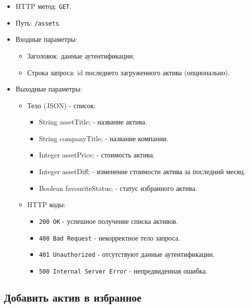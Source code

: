 \documentclass[a4paper, 14pt]{article}
\begin{document}
\begin{itemize}
    \item HTTP метод: \texttt{GET}.
    \item Путь: \texttt{/assets}.
    \item Входные параметры:
    \begin{itemize}
        \item Заголовок: данные аутентификации;
        \item Строка запроса: id последнего загруженного актива (опционально).
    \end{itemize}
    \item Выходные параметры:
    \begin{itemize}
        \item Тело (JSON) - список:
        \begin{itemize}
            \item String assetTitle; - название актива.
            \item String companyTitle; - название компании.
            \item Integer assetPrice; - стоимость актива.
            \item Integer assetDiff; - изменение стоимости актива за последний месяц.
            \item Boolean favouriteStatus; - статус избранного актива.
        \end{itemize}
        \item HTTP коды:
        \begin{itemize}
            \item \texttt{200 OK} - успешное получение списка активов.
            \item \texttt{400 Bad Request} - некорректное тело запроса.
            \item \texttt{401 Unauthorized} - отсутствуют данные аутентификации.
            \item \texttt{500 Internal Server Error} - непредвиденная ошибка.
        \end{itemize}
    \end{itemize}
\end{itemize}

\subsection{Добавить актив в избранное}
\end{document}
